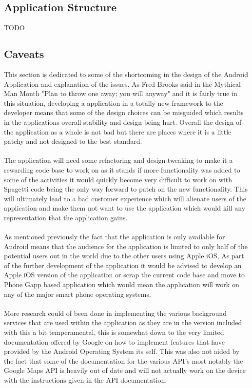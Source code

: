 \subsection{Application Structure}
\label{sec:android_application_structure}

{TODO}

\subsection{Caveats}

This section is dedicated to some of the shortcoming in the design of the Android Application and explanation of the issues. As Fred Brooks said in the Mythical Man Month \cite{fredbrooks:throwoneaway:1995:online} "Plan to throw one away; you will anyway" and it is fairly true in this situation, developing a application in a totally new framework to the developer means that some of the design choices can be misguided which results in the applications overall stability and design being hurt. Overall the design of the application as a whole is not bad but there are places where it is a little patchy and not designed to the best standard.\\
\\
The application will need some refactoring and design tweaking to make it a rewarding code base to work on as it stands if more functionality was added to some of the activities it would quickly become very difficult to work on with Spagetti code being the only way forward to patch on the new functionality. This will ultimately lead to a bad customer experience which will alienate users of the application and make them not want to use the application which would kill any representation that the application gains.\\
\\
As mentioned previously the fact that the application is only available for Android means that the audience for the application is limited to only half of the potential users out in the world due to the other users using Apple iOS, As part of the further development of the application it would be advised to develop an Apple iOS version of the application or scrap the current code base and move to Phone Gapp based application which would mean the application will work on any of the major smart phone operating systems.\\
\\
More research could of been done in implementing the various background services that are used within the application as they are in the version included with this a bit temperamental, this is somewhat down to the very limited documentation offered by Google on how to implement features that have provided by the Android Operating System its self. This was also not aided by the fact that some of the documentation for the various API's most notably the Google Maps API is heavily out of date and will not actually work on the device with the instructions given in the API documentation.\\
\\

